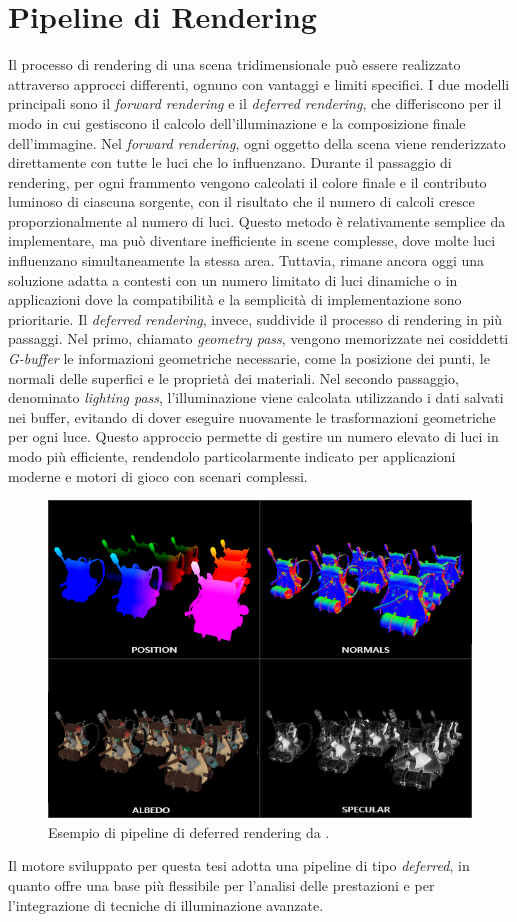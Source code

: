 \documentclass[12pt,a4paper,openright,twoside]{book}
\begin{document}
\section{Pipeline di Rendering}
Il processo di rendering di una scena tridimensionale può essere realizzato attraverso approcci differenti,
ognuno con vantaggi e limiti specifici. I due modelli principali sono il \emph{forward rendering} e il
\emph{deferred rendering}, che differiscono per il modo in cui gestiscono il calcolo dell'illuminazione e la
composizione finale dell'immagine.
Nel \emph{forward rendering}, ogni oggetto della scena viene renderizzato direttamente con tutte le luci che lo influenzano.
Durante il passaggio di rendering, per ogni frammento vengono calcolati il colore finale e il contributo luminoso
di ciascuna sorgente, con il risultato che il numero di calcoli cresce proporzionalmente al numero di luci.
Questo metodo è relativamente semplice da implementare, ma può diventare inefficiente in scene complesse, dove molte
luci influenzano simultaneamente la stessa area. Tuttavia, rimane ancora oggi una soluzione adatta a contesti con un
numero limitato di luci dinamiche o in applicazioni dove la compatibilità e la semplicità di implementazione sono prioritarie.
Il \emph{deferred rendering}, invece, suddivide il processo di rendering in più passaggi. Nel primo, chiamato
\emph{geometry pass}, vengono memorizzate nei cosiddetti \emph{G-buffer} le informazioni geometriche necessarie,
come la posizione dei punti, le normali delle superfici e le proprietà dei materiali. Nel secondo passaggio,
denominato \emph{lighting pass}, l'illuminazione viene calcolata utilizzando i dati salvati nei buffer,
evitando di dover eseguire nuovamente le trasformazioni geometriche per ogni luce. Questo approccio permette di gestire
un numero elevato di luci in modo più efficiente, rendendolo particolarmente indicato per applicazioni moderne e motori
di gioco con scenari complessi.
\begin{figure}[h!]
   \centering
   \includegraphics[width=.8\linewidth]{figures/g_buffer_example.png}
   \caption{Esempio di pipeline di deferred rendering da \cite{learnopengl}.}
   \label{fig:deferred-pipeline}
\end{figure}
Il motore sviluppato per questa tesi adotta una pipeline di tipo \emph{deferred}, in quanto offre una base più
flessibile per l'analisi delle prestazioni e per l'integrazione di tecniche di illuminazione avanzate.
\end{document}
